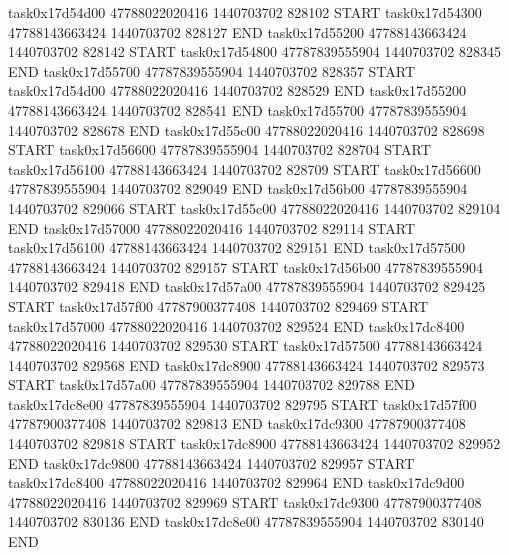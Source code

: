 task0x17d54d00 47788022020416          1440703702               828102  START
task0x17d54300 47788143663424          1440703702               828127  END
task0x17d55200 47788143663424          1440703702               828142  START
task0x17d54800 47787839555904          1440703702               828345  END
task0x17d55700 47787839555904          1440703702               828357  START
task0x17d54d00 47788022020416          1440703702               828529  END
task0x17d55200 47788143663424          1440703702               828541  END
task0x17d55700 47787839555904          1440703702               828678  END
task0x17d55c00 47788022020416          1440703702               828698  START
task0x17d56600 47787839555904          1440703702               828704  START
task0x17d56100 47788143663424          1440703702               828709  START
task0x17d56600 47787839555904          1440703702               829049  END
task0x17d56b00 47787839555904          1440703702               829066  START
task0x17d55c00 47788022020416          1440703702               829104  END
task0x17d57000 47788022020416          1440703702               829114  START
task0x17d56100 47788143663424          1440703702               829151  END
task0x17d57500 47788143663424          1440703702               829157  START
task0x17d56b00 47787839555904          1440703702               829418  END
task0x17d57a00 47787839555904          1440703702               829425  START
task0x17d57f00 47787900377408          1440703702               829469  START
task0x17d57000 47788022020416          1440703702               829524  END
task0x17dc8400 47788022020416          1440703702               829530  START
task0x17d57500 47788143663424          1440703702               829568  END
task0x17dc8900 47788143663424          1440703702               829573  START
task0x17d57a00 47787839555904          1440703702               829788  END
task0x17dc8e00 47787839555904          1440703702               829795  START
task0x17d57f00 47787900377408          1440703702               829813  END
task0x17dc9300 47787900377408          1440703702               829818  START
task0x17dc8900 47788143663424          1440703702               829952  END
task0x17dc9800 47788143663424          1440703702               829957  START
task0x17dc8400 47788022020416          1440703702               829964  END
task0x17dc9d00 47788022020416          1440703702               829969  START
task0x17dc9300 47787900377408          1440703702               830136  END
task0x17dc8e00 47787839555904          1440703702               830140  END
